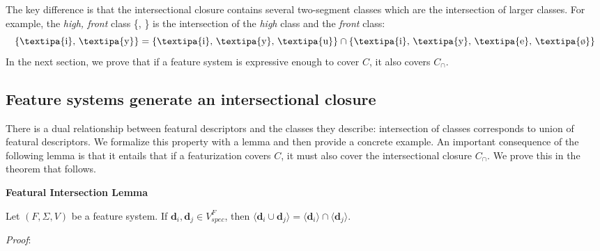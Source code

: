 \documentclass[12pt, oneside]{article}   	%
\newenvironment{clump}
{
	\edef\myindent{\the\parindent}
	\noindent\begin{minipage}{\textwidth}
	\setlength\parindent{\myindent}\fussy
}
{
	\end{minipage}
}
\begin{document}
%

The key difference is that the intersectional closure contains several two-segment classes which are the intersection of larger classes. For example, the \textit{high, front} class \{, \} is the intersection of the \textit{high} class and the \textit{front} class:
$$ \text{\{\textipa{i}, \textipa{y}\}} = \text{\{\textipa{i}, \textipa{y}, \textipa{u}\}} \cap \text{\{\textipa{i}, \textipa{y}, \textipa{e}, \textipa{\o}\}} $$
In the next section, we prove that if a feature system is expressive enough to cover $C$, it also covers $C_\cap$.

\subsection{Feature systems generate an intersectional closure}

There is a dual relationship between featural descriptors and the classes they describe: intersection of classes corresponds to union of featural descriptors. We formalize this property with a lemma and then provide a concrete example. An important consequence of the following lemma is that it entails that if a featurization covers $C$, it must also cover the intersectional closure $C_\cap$. We prove this in the theorem that follows.

\begin{clump}
\vspace{\baselineskip} \noindent \textbf{Featural Intersection Lemma}

\indent Let $(F, \Sigma, V)$ be a feature system. If $\mathbf{d}_i, \mathbf{d}_j \in V_{spec}^F$, then $\langle \mathbf{d}_i \cup \mathbf{d}_j \rangle =  \langle \mathbf{d}_i \rangle \cap \langle \mathbf{d}_j \rangle$.
\end{clump}

\noindent \textit{Proof}:
\end{document}
